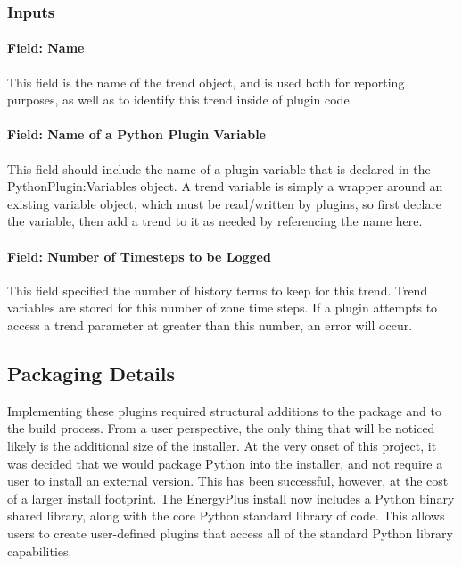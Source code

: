\subsubsection{Inputs}

\paragraph{Field: Name}

This field is the name of the trend object, and is used both for reporting purposes, as well as to identify this trend inside of plugin code.

\paragraph{Field: Name of a Python Plugin Variable}

This field should include the name of a plugin variable that is declared in the PythonPlugin:Variables object.
A trend variable is simply a wrapper around an existing variable object, which must be read/written by plugins, so first declare the variable, then add a trend to it as needed by referencing the name here.

\paragraph{Field: Number of Timesteps to be Logged}

This field specified the number of history terms to keep for this trend.
Trend variables are stored for this number of zone time steps.
If a plugin attempts to access a trend parameter at greater than this number, an error will occur.

\subsection{Packaging Details}

Implementing these plugins required structural additions to the package and to the build process.
From a user perspective, the only thing that will be noticed likely is the additional size of the installer.
At the very onset of this project, it was decided that we would package Python into the installer, and not require a user to install an external version.
This has been successful, however, at the cost of a larger install footprint.
The EnergyPlus install now includes a Python binary shared library, along with the core Python standard library of code.
This allows users to create user-defined plugins that access all of the standard Python library capabilities.

